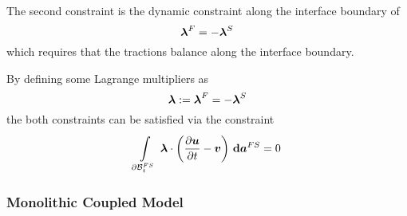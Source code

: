 The second constraint is the dynamic constraint along the interface boundary
of
\begin{equation}
  \vectr{\lambda}^{F}= -\vectr{\lambda}^{S} \label{eqn:FSIDynamicConstraint}
\end{equation}
which requires that the tractions balance along the interface boundary.

By defining some Lagrange multipliers as
\begin{equation}
  \boldsymbol{\lambda}:=\boldsymbol{\lambda}^{F}=-\boldsymbol{\lambda}^{S}
\end{equation}
the both constraints can be satisfied via the constraint
\begin{equation}
  \gint{\boundary{\embedmanifold{B}}^{FS}_{t}}{}{\dotprod{\vectr{\lambda}}{\pbrac{\delby{\vectr{u}}{t}-\vectr{v}}}}{\covectr{a}^{FS}}=0 \label{eqn:FSIConstraint}
\end{equation}

\subsubsection{Monolithic Coupled Model}

